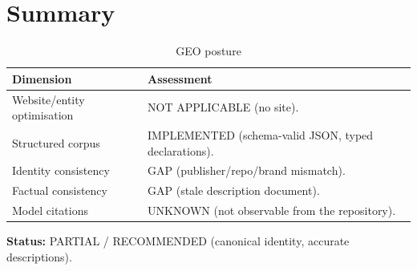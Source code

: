 \section{Summary}

\begin{table}[H]
\centering
\caption{GEO posture}
\begin{tabular}{p{4.6cm}p{9.6cm}}
\toprule
\textbf{Dimension} & \textbf{Assessment} \\
\midrule
Website/entity optimisation & NOT APPLICABLE (no site). \\
Structured corpus & IMPLEMENTED (schema-valid JSON, typed declarations). \\
Identity consistency & GAP (publisher/repo/brand mismatch). \\
Factual consistency & GAP (stale description document). \\
Model citations & UNKNOWN (not observable from the repository). \\
\bottomrule
\end{tabular}
\end{table}

\textbf{Status:} PARTIAL / RECOMMENDED (canonical identity, accurate descriptions).
